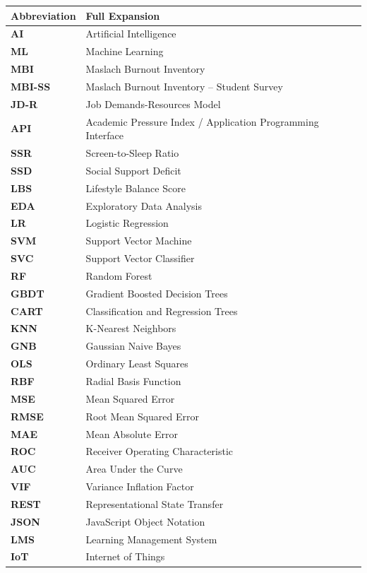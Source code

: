 \documentclass[12pt,a4paper,oneside]{report}
\begin{document}
\begin{table}[H]
\centering
\begin{tabularx}{\textwidth}{lX}
\toprule
\textbf{Abbreviation} & \textbf{Full Expansion} \\
\midrule
\textbf{AI} & Artificial Intelligence \\
\textbf{ML} & Machine Learning \\
\textbf{MBI} & Maslach Burnout Inventory \\
\textbf{MBI-SS} & Maslach Burnout Inventory -- Student Survey \\
\textbf{JD-R} & Job Demands-Resources Model \\
\textbf{API} & Academic Pressure Index / Application Programming Interface \\
\textbf{SSR} & Screen-to-Sleep Ratio \\
\textbf{SSD} & Social Support Deficit \\
\textbf{LBS} & Lifestyle Balance Score \\
\textbf{EDA} & Exploratory Data Analysis \\
\textbf{LR} & Logistic Regression \\
\textbf{SVM} & Support Vector Machine \\
\textbf{SVC} & Support Vector Classifier \\
\textbf{RF} & Random Forest \\
\textbf{GBDT} & Gradient Boosted Decision Trees \\
\textbf{CART} & Classification and Regression Trees \\
\textbf{KNN} & K-Nearest Neighbors \\
\textbf{GNB} & Gaussian Naive Bayes \\
\textbf{OLS} & Ordinary Least Squares \\
\textbf{RBF} & Radial Basis Function \\
\textbf{MSE} & Mean Squared Error \\
\textbf{RMSE} & Root Mean Squared Error \\
\textbf{MAE} & Mean Absolute Error \\
\textbf{ROC} & Receiver Operating Characteristic \\
\textbf{AUC} & Area Under the Curve \\
\textbf{VIF} & Variance Inflation Factor \\
\textbf{REST} & Representational State Transfer \\
\textbf{JSON} & JavaScript Object Notation \\
\textbf{LMS} & Learning Management System \\
\textbf{IoT} & Internet of Things \\
\bottomrule
\end{tabularx}
\end{table}
\end{document}
